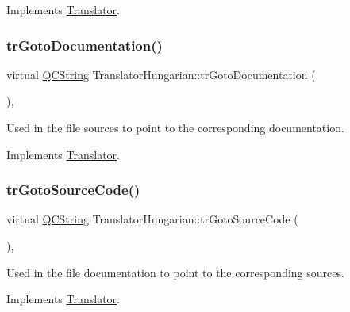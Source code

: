 Implements \mbox{\hyperlink{class_translator}{Translator}}.

\mbox{\label{class_translator_hungarian_a3a9399bf9c115a26197be7048893878d}} 
\subsubsection{\texorpdfstring{trGotoDocumentation()}{trGotoDocumentation()}}
{\footnotesize\ttfamily virtual \mbox{\hyperlink{class_q_c_string}{Q\+C\+String}} Translator\+Hungarian\+::tr\+Goto\+Documentation (\begin{DoxyParamCaption}{ }\end{DoxyParamCaption})\hspace{0.3cm}{\ttfamily [inline]}, {\ttfamily [virtual]}}

Used in the file sources to point to the corresponding documentation. 

Implements \mbox{\hyperlink{class_translator}{Translator}}.

\mbox{\label{class_translator_hungarian_adc910fd5caaaeed1f7589530fd816acb}} 
\subsubsection{\texorpdfstring{trGotoSourceCode()}{trGotoSourceCode()}}
{\footnotesize\ttfamily virtual \mbox{\hyperlink{class_q_c_string}{Q\+C\+String}} Translator\+Hungarian\+::tr\+Goto\+Source\+Code (\begin{DoxyParamCaption}{ }\end{DoxyParamCaption})\hspace{0.3cm}{\ttfamily [inline]}, {\ttfamily [virtual]}}

Used in the file documentation to point to the corresponding sources. 

Implements \mbox{\hyperlink{class_translator}{Translator}}.

\mbox{\label{class_translator_hungarian_a42ceefdcec50483e656f9124abf15751}} 
